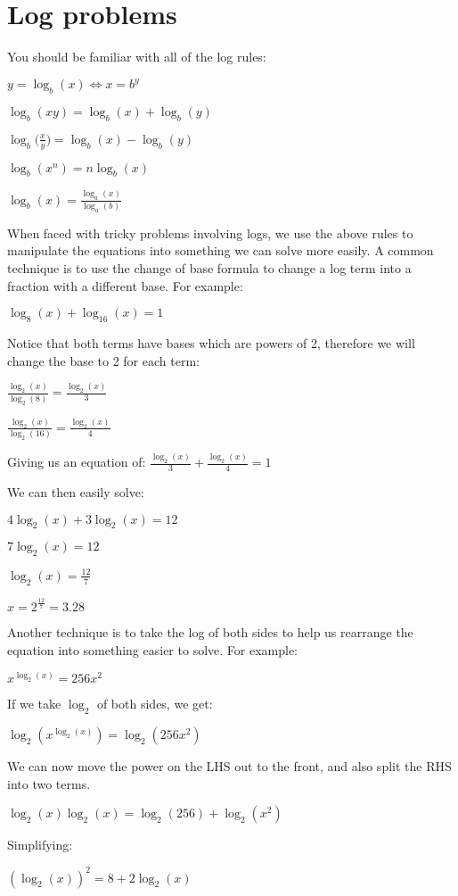 \documentclass[../main.tex]{subfiles}
\begin{document}
\section{Log problems}
You should be familiar with all of the log rules:

\(y=\log_b(x) \Longleftrightarrow x=b^y \)

\(\log_b(xy)=\log_b(x)+\log_b(y) \)

\(\log_b\bigl(\frac{x}{y}\bigr)=\log_b(x)-\log_b(y) \)

\(\log_b(x^n)=n\log_b(x) \)

\(\log_b(x)=\frac{\log_a(x)}{\log_a(b)} \)

When faced with tricky problems involving logs, we use the above rules to manipulate the equations into something we can solve more easily.
A common technique is to use the change of base formula to change a log term into a fraction with a different base. For example:

\(\log_8(x)+\log_16(x)=1 \)

Notice that both terms have bases which are powers of 2, therefore we will change the base to 2 for each term:

\(\frac{\log_2(x)}{\log_2(8)}=\frac{\log_2(x)}{3} \)

\(\frac{\log_2(x)}{\log_2(16)}=\frac{\log_2(x)}{4} \)

Giving us an equation of: \(\frac{\log_2(x)}{3}+\frac{\log_2(x)}{4}=1\)

We can then easily solve:

\(4\log_2(x)+3\log_2(x)=12\)

\(7\log_2(x)=12\)

\(\log_2(x)=\frac{12}{7}\)

\(x=2^{\frac{12}{7}}=3.28\)

Another technique is to take the log of both sides to help us rearrange the equation into something easier to solve. For example:

\(x^{\log_2(x)}=256x^2 \)

If we take $\log_2$ of both sides, we get:

\(\log_2(x^{\log_2(x)})=\log_2(256x^2)\)

We can now move the power on the LHS out to the front, and also split the RHS into two terms.

\(\log_2(x)\log_2(x)=\log_2(256)+\log_2(x^2)\)

Simplifying:

\((\log_2(x))^2=8+2\log_2(x)\)
\end{document}
